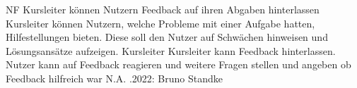 \begin{myreq}
    \threeinline
    {\reqno}
    {\reqtype NF}
    {}
    \reqdesc Kursleiter können Nutzern Feedback auf ihren Abgaben hinterlassen
    \reqrat Kursleiter können Nutzern, welche Probleme mit einer Aufgabe hatten, Hilfestellungen bieten. Diese soll den Nutzer auf Schwächen hinweisen und Lösungsansätze aufzeigen.
    \reqorig Kursleiter
    \reqfit Kursleiter kann Feedback hinterlassen. Nutzer kann auf Feedback reagieren und weitere Fragen stellen und angeben ob Feedback hilfreich war
    \twoinline
    {}
    {}
    \twoinline
    {}
    {\reqconf N.A.}
    \reqmater {}
    .2022: Bruno Standke
\end{myreq}